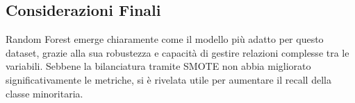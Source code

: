 \documentclass[a4paper,12pt]{article}
\begin{document}
\subsection{Considerazioni Finali}
Random Forest emerge chiaramente come il modello più adatto per questo dataset, grazie alla sua robustezza e capacità di gestire relazioni complesse tra le variabili. Sebbene la bilanciatura tramite SMOTE non abbia migliorato significativamente le metriche, si è rivelata utile per aumentare il recall della classe minoritaria.
\end{document}

